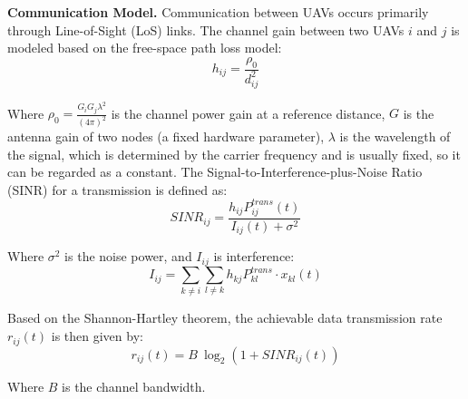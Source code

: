 \documentclass[runningheads]{llncs}
\begin{document}
\textbf{Communication Model.} Communication between UAVs occurs primarily through Line-of-Sight (LoS) links\cite{qtar}. The channel gain between two UAVs $i$ and $j$ is modeled based on the free-space path loss model:
\begin{equation}
    h_{ij}=\frac{\rho_{0}}{d_{ij}^{2}}
\end{equation}

Where $\rho_{0}=\frac{G_{i}G_{j}\lambda^{2}}{(4\pi)^{2}}$ is the channel power gain at a reference distance, $G$ is the antenna gain of two nodes (a fixed hardware parameter), $\lambda$ is the wavelength of the signal, which is determined by the carrier frequency and is usually fixed, so it can be regarded as a constant. The Signal-to-Interference-plus-Noise Ratio (SINR) for a transmission is defined as:
\begin{equation}
    SINR_{ij}=\frac{h_{ij}P_{ij}^{trans}(t)}{I_{ij}(t)+\sigma^{2}}
\end{equation}

Where $\sigma^{2}$ is the noise power, and $I_{ij}$ is interference:
\begin{equation}
    I_{ij}=\sum_{k \neq i} \sum_{l \neq k} {h_{kj}P_{kl}^{trans}\cdot x_{kl}(t)}
\end{equation}

Based on the Shannon-Hartley theorem, the achievable data transmission rate $r_{ij}(t)$ is then given by:
\begin{equation}
    r_{ij}(t)=B~\log_{2}(1+SINR_{ij}(t))
\label{eq:rij}
\end{equation}

Where $B$ is the channel bandwidth.
\end{document}
